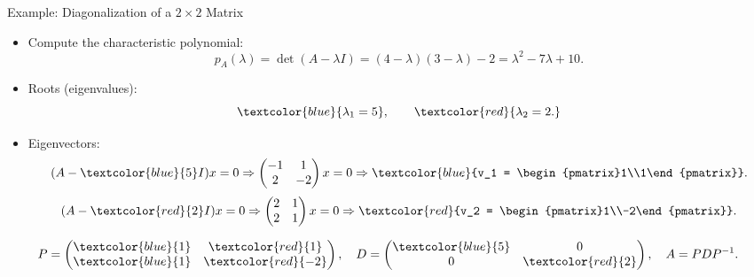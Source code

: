 \documentclass[aspectratio=169]{beamer}
\begin{document}
\begin{frame}{Example: Diagonalization of a $2\times2$ Matrix}

\begin{itemize}
  \item Compute the characteristic polynomial:
  \[
  p_A(\lambda) = \det(A - \lambda I) 
  = (4-\lambda)(3-\lambda) - 2 
  = \lambda^2 - 7\lambda + 10.
  \]
  \item Roots (eigenvalues):
  \[
  \textcolor{blue}{\lambda_1 = 5}, 
  \qquad 
  \textcolor{red}{\lambda_2 = 2.}
  \]

  \pause

  \item Eigenvectors:
  \[
  (A - \textcolor{blue}{5}I)x = 0 
  \Rightarrow 
  \begin{pmatrix}
  -1 & 1\\
  2 & -2
  \end{pmatrix}
  x = 0
  \Rightarrow 
  \textcolor{blue}{v_1 = 
  \begin{pmatrix}1\\1\end{pmatrix}}.
  \]
  \[
  (A - \textcolor{red}{2}I)x = 0 
  \Rightarrow 
  \begin{pmatrix}
  2 & 1\\
  2 & 1
  \end{pmatrix}
  x = 0
  \Rightarrow 
  \textcolor{red}{v_2 = 
  \begin{pmatrix}1\\-2\end{pmatrix}}.
  \]
\end{itemize}

\pause
\[
P = 
\begin{pmatrix}
\textcolor{blue}{1} & \textcolor{red}{1}\\
\textcolor{blue}{1} & \textcolor{red}{-2}
\end{pmatrix},
\quad
D = 
\begin{pmatrix}
\textcolor{blue}{5} & 0\\
0 & \textcolor{red}{2}
\end{pmatrix},
\quad
A = P D P^{-1}.
\]
\end{frame}
\end{document}
